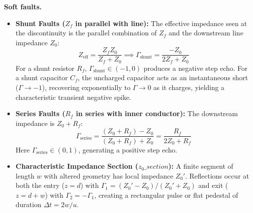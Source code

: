 \textbf{Soft faults.}
\begin{itemize}
    \item \textbf{Shunt Faults ($Z_f$ in parallel with line):} The effective impedance seen at the discontinuity is the parallel combination of $Z_f$ and the downstream line impedance $Z_0$:
    \begin{equation}
    Z_{\mathrm{eff}} = \frac{Z_f Z_0}{Z_f + Z_0} \implies \Gamma_{\mathrm{shunt}} = \frac{-Z_0}{2 Z_f + Z_0}
    \label{eq:gamma_shunt}
    \end{equation}
    For a shunt resistor $R_f$, $\Gamma_{\mathrm{shunt}} \in (-1, 0)$ produces a negative step echo. For a shunt capacitor $C_f$, the uncharged capacitor acts as an instantaneous short ($\Gamma \to -1$), recovering exponentially to $\Gamma \to 0$ as it charges, yielding a characteristic transient negative spike.
    \item \textbf{Series Faults ($R_f$ in series with inner conductor):} The downstream impedance is $Z_0 + R_f$:
    \begin{equation}
    \Gamma_{\mathrm{series}} = \frac{(Z_0 + R_f) - Z_0}{(Z_0 + R_f) + Z_0} = \frac{R_f}{2 Z_0 + R_f}
    \label{eq:gamma_series}
    \end{equation}
    Here $\Gamma_{\mathrm{series}} \in (0, 1)$, generating a positive step echo.
    \item \textbf{Characteristic Impedance Section ($z_0\_section$):} A finite segment of length $w$ with altered geometry has local impedance $Z_0'$. Reflections occur at both the entry ($z=d$) with $\Gamma_1 = (Z_0' - Z_0)/(Z_0' + Z_0)$ and exit ($z=d+w$) with $\Gamma_2 = -\Gamma_1$, creating a rectangular pulse or flat pedestal of duration $\Delta t = 2w/u$.
\end{itemize}

